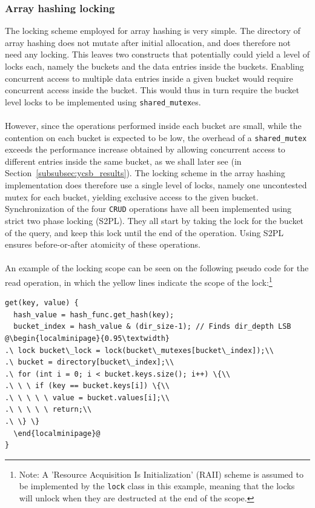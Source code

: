 \documentclass[11pt]{article} %
\begin{document}
\subsubsection{Array hashing locking}
\label{subsubsec:design_array_hashing_locking}
The locking scheme employed for array hashing is very simple. The directory of array hashing does not mutate after initial allocation, and does therefore not need any locking. This leaves two constructs that potentially could yield a level of locks each, namely the buckets and the data entries inside the buckets. Enabling concurrent access to multiple data entries inside a given bucket would require concurrent access inside the bucket. This would thus in turn require the bucket level locks to be implemented using \verb|shared_mutex|es. \\
\\
However, since the operations performed inside each bucket are small, while the contention on each bucket is expected to be low, the overhead of a \verb|shared_mutex| exceeds the performance increase obtained by allowing concurrent access to different entries inside the same bucket, as we shall later see (in Section~\ref{subsubsec:ycsb_results}). The locking scheme in the array hashing implementation does therefore use a single level of locks, namely one uncontested mutex for each bucket, yielding exclusive access to the given bucket. \\
Synchronization of the four \verb|CRUD| operations have all been implemented using strict two phase locking (S2PL). They all start by taking the lock for the bucket of the query, and keep this lock until the end of the operation. Using S2PL ensures before-or-after atomicity of these operations. \\
\\
An example of the locking scope can be seen on the following pseudo code for the read operation, in which the yellow lines indicate the scope of the lock:\footnote{Note: A 'Resource Acquisition Is Initialization' (RAII) scheme is assumed to be implemented by the \verb|lock| class in this example, meaning that the locks will unlock when they are destructed at the end of the scope.}\\
\begin{fminipage}{\linewidth}
\begin{lstlisting}[escapechar=@]
get(key, value) {
  hash_value = hash_func.get_hash(key);
  bucket_index = hash_value & (dir_size-1); // Finds dir_depth LSB  @\begin{localminipage}{0.95\textwidth}
.\ lock bucket\_lock = lock(bucket\_mutexes[bucket\_index]);\\
.\ bucket = directory[bucket\_index];\\
.\ for (int i = 0; i < bucket.keys.size(); i++) \{\\
.\ \ \ if (key == bucket.keys[i]) \{\\
.\ \ \ \ \ value = bucket.values[i];\\
.\ \ \ \ \ return;\\
.\ \} \}
  \end{localminipage}@
}
\end{lstlisting}
\end{fminipage}
\end{document}
